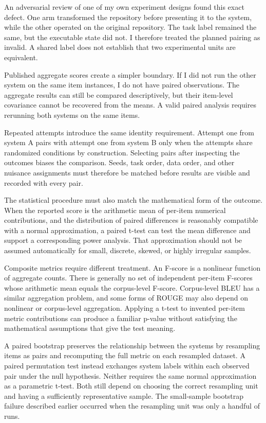 An adversarial review of one of my own experiment designs found this exact defect. One arm transformed the repository before presenting it to the system, while the other operated on the original repository. The task label remained the same, but the executable state did not. I therefore treated the planned pairing as invalid. A shared label does not establish that two experimental units are equivalent.

Published aggregate scores create a simpler boundary. If I did not run the other system on the same item instances, I do not have paired observations. The aggregate results can still be compared descriptively, but their item-level covariance cannot be recovered from the means. A valid paired analysis requires rerunning both systems on the same items.

Repeated attempts introduce the same identity requirement. Attempt one from system A pairs with attempt one from system B only when the attempts share randomized conditions by construction. Selecting pairs after inspecting the outcomes biases the comparison. Seeds, task order, data order, and other nuisance assignments must therefore be matched before results are visible and recorded with every pair.

The statistical procedure must also match the mathematical form of the outcome. When the reported score is the arithmetic mean of per-item numerical contributions, and the distribution of paired differences is reasonably compatible with a normal approximation, a paired t-test can test the mean difference and support a corresponding power analysis. That approximation should not be assumed automatically for small, discrete, skewed, or highly irregular samples.

Composite metrics require different treatment. An F-score is a nonlinear function of aggregate counts. There is generally no set of independent per-item F-scores whose arithmetic mean equals the corpus-level F-score. Corpus-level BLEU has a similar aggregation problem, and some forms of ROUGE may also depend on nonlinear or corpus-level aggregation. Applying a t-test to invented per-item metric contributions can produce a familiar p-value without satisfying the mathematical assumptions that give the test meaning.

A paired bootstrap preserves the relationship between the systems by resampling items as pairs and recomputing the full metric on each resampled dataset. A paired permutation test instead exchanges system labels within each observed pair under the null hypothesis. Neither requires the same normal approximation as a parametric t-test. Both still depend on choosing the correct resampling unit and having a sufficiently representative sample. The small-sample bootstrap failure described earlier occurred when the resampling unit was only a handful of runs.

